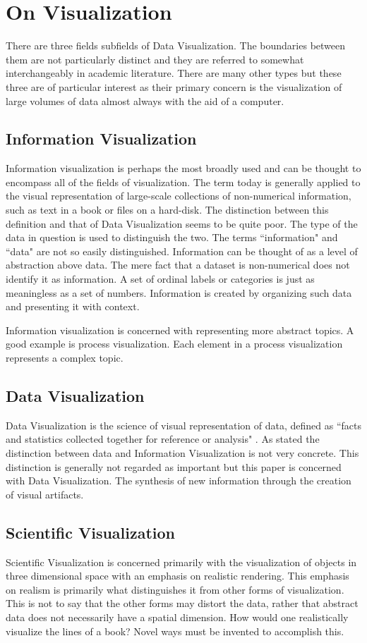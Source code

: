 \documentclass[a4paper, 11pt, titlepage, onehalfspacing]{report}
\begin{document}
\section{On Visualization}
There are three fields subfields of Data Visualization. The boundaries between them are not particularly distinct and they are referred to somewhat interchangeably in academic literature. There are many other types but these three are of particular interest as their primary concern is the visualization of large volumes of data almost always with the aid of a computer.
\subsection{Information Visualization}
Information visualization is perhaps the most broadly used and can be thought to encompass all of the fields of visualization. The term today is generally applied to the visual representation of large-scale collections of non-numerical information, such as text in a book or files on a hard-disk. The distinction between this definition and that of Data Visualization seems to be quite poor. The type of the data in question is used to distinguish the two. The terms ``information" and ``data" are not so easily distinguished. Information can be thought of as a level of abstraction above data. The mere fact that a dataset is non-numerical does not identify it as information. A set of ordinal labels or categories is just as meaningless as a set of numbers. Information is created by organizing such data and presenting it with context.

Information visualization is concerned with representing more abstract topics. A good example is process visualization. Each element in a process visualization represents a complex topic.

\subsection{Data Visualization}
Data Visualization is the science of visual representation of data, defined as ``facts and statistics collected together for reference or analysis" \cite{oed31}. As stated the distinction between data and Information Visualization is not very concrete. This distinction is generally not regarded as important but this paper is concerned with Data Visualization. The synthesis of new information through the creation of visual artifacts.

\subsection{Scientific Visualization}
Scientific Visualization is concerned primarily with the visualization of objects in three dimensional space with an emphasis on realistic rendering. This emphasis on realism is primarily what distinguishes it from other forms of visualization. This is not to say that the other forms may distort the data, rather that abstract data does not necessarily have a spatial dimension. How would one realistically visualize the lines of a book? Novel ways must be invented to accomplish this.
\end{document}
